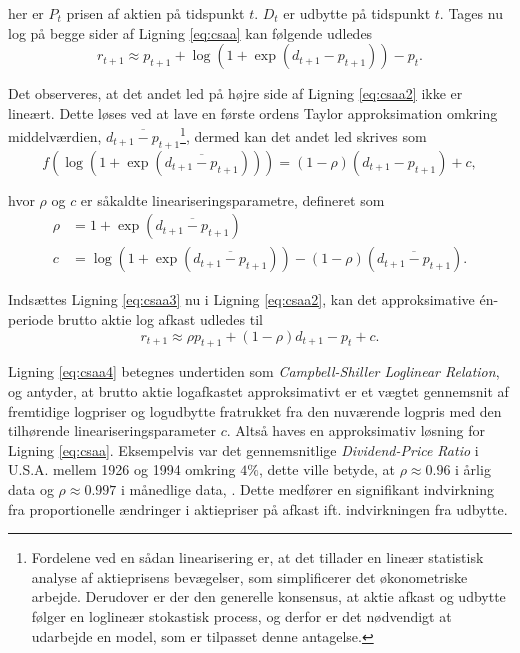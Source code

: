 \documentclass[
  a4paper,
  oneside]{memoir}
\begin{document}
her er \(P_t\) prisen af aktien på tidspunkt \(t\). \(D_t\) er udbytte på tidspunkt \(t\). Tages nu log på begge sider af Ligning \eqref{eq:csaa} kan følgende udledes
\begin{equation}
r_{t+1}\approx p_{t+1}+\log\left(1+\exp\left(d_{t+1}-p_{t+1}\right)\right)-p_t. \label{eq:csaa2}
\end{equation}

Det observeres, at det andet led på højre side af Ligning \eqref{eq:csaa2} ikke er lineært. Dette løses ved at lave en første ordens Taylor approksimation omkring middelværdien, \(\overline{d_{t+1}-p_{t+1}}\)\footnote{Fordelene ved en sådan linearisering er, at det tillader en lineær statistisk analyse af aktieprisens bevægelser, som simplificerer det økonometriske arbejde. Derudover er der den generelle konsensus, at aktie afkast og udbytte følger en loglineær stokastisk process, og derfor er det nødvendigt at udarbejde en model, som er tilpasset denne antagelse.}, dermed kan det andet led skrives som
\begin{equation}
f\left(\log\left(1+\exp\left(\overline{d_{t+1}-p_{t+1}}\right)\right)\right) = (1-\rho)(d_{t+1}-p_{t+1}) + c, \label{eq:csaa3}
\end{equation}

hvor \(\rho\) og \(c\) er såkaldte lineariseringsparametre, defineret som
\begin{align*}
\rho&=1+\exp\left(\overline{d_{t+1}-p_{t+1}}\right)\\
c&=\log\left(1+\exp\left(\overline{d_{t+1}-p_{t+1}}\right)\right)-(1-\rho)(\overline{d_{t+1}-p_{t+1}}).
\end{align*}

Indsættes Ligning \eqref{eq:csaa3} nu i Ligning \eqref{eq:csaa2}, kan det approksimative én-periode brutto aktie log afkast udledes til
\begin{equation}
r_{t+1}\approx \rho p_{t+1} + (1-\rho)d_{t+1}-p_t+c. \label{eq:csaa4}
\end{equation}

Ligning \eqref{eq:csaa4} betegnes undertiden som \emph{Campbell-Shiller Loglinear Relation}, og antyder, at brutto aktie logafkastet approksimativt er et vægtet gennemsnit af fremtidige logpriser og logudbytte fratrukket fra den nuværende logpris med den tilhørende lineariseringsparameter \(c\). Altså haves en approksimativ løsning for Ligning \eqref{eq:csaa}. Eksempelvis var det gennemsnitlige \emph{Dividend-Price Ratio} i U.S.A. mellem 1926 og 1994 omkring \(4\%\), dette ville betyde, at \(\rho\approx 0.96\) i årlig data og \(\rho\approx 0.997\) i månedlige data, \citep{Campbell1997}. Dette medfører en signifikant indvirkning fra proportionelle ændringer i aktiepriser på afkast ift. indvirkningen fra udbytte.
\end{document}
